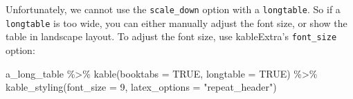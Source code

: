 \documentclass[a4paper, nobind]{templates/ociamthesis}
\newenvironment{Shaded}{\begin{snugshade}}{\end{snugshade}}
\newcommand{\AttributeTok}[1]{\textcolor[rgb]{0.77,0.63,0.00}{#1}}
\newcommand{\ConstantTok}[1]{\textcolor[rgb]{0.00,0.00,0.00}{#1}}
\newcommand{\DecValTok}[1]{\textcolor[rgb]{0.00,0.00,0.81}{#1}}
\newcommand{\FunctionTok}[1]{\textcolor[rgb]{0.00,0.00,0.00}{#1}}
\newcommand{\NormalTok}[1]{#1}
\newcommand{\SpecialCharTok}[1]{\textcolor[rgb]{0.00,0.00,0.00}{#1}}
\newcommand{\StringTok}[1]{\textcolor[rgb]{0.31,0.60,0.02}{#1}}
\renewenvironment{Shaded}
{
  \vspace{10pt}%
  \begin{snugshade}%
}{%
  \end{snugshade}%
  \vspace{8pt}%
}
\begin{document}
Unfortunately, we cannot use the \texttt{scale\_down} option with a \texttt{longtable}.
So if a \texttt{longtable} is too wide, you can either manually adjust the font size, or show the table in landscape layout.
To adjust the font size, use kableExtra's \texttt{font\_size} option:

\begin{Shaded}
\begin{Highlighting}[]
\NormalTok{a\_long\_table }\SpecialCharTok{\%\textgreater{}\%} 
  \FunctionTok{kable}\NormalTok{(}\AttributeTok{booktabs =} \ConstantTok{TRUE}\NormalTok{, }\AttributeTok{longtable =} \ConstantTok{TRUE}\NormalTok{) }\SpecialCharTok{\%\textgreater{}\%} 
  \FunctionTok{kable\_styling}\NormalTok{(}\AttributeTok{font\_size =} \DecValTok{9}\NormalTok{, }\AttributeTok{latex\_options =} \StringTok{"repeat\_header"}\NormalTok{)}
\end{Highlighting}
\end{Shaded}

\begingroup\fontsize{9}{11}\selectfont
\end{document}
